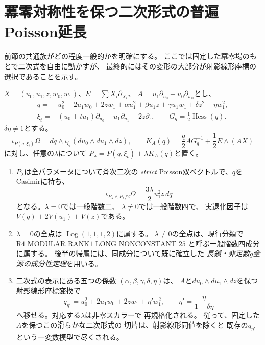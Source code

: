 
\section{冪零対称性を保つ二次形式の普遍Poisson延長}
\label{sec:universal-nilpotent-pencil}
前節の共通族がどの程度一般的かを明確にする。
ここでは固定した冪零場のもとで二次式を自由に動かすが、
最終的にはその変形の大部分が射影線形座標の選択であることを示す。

\begin{theorem}[冪零対称性に沿う普遍延長と二次式の規格化]
\label{thm:universal-nilpotent-pencil}
$X=(u_0,u_1,z,w_0,w_1)$、$E=\sum X_i\partial_{X_i}$、
$A=u_1\partial_{u_0}-u_0\partial_{w_0}$とし、
\[
\begin{split}
q={}&u_0^2+2u_1w_0+2zw_1+
\alpha u_1^2+\beta u_1z+\gamma u_1w_1
+\delta z^2+\eta w_1^2,\\
\xi_t={}&(u_0+tu_1)\partial_{u_0}
             +u_1\partial_{u_1}-2z\partial_z,
\qquad G_q=\tfrac12\operatorname{Hess}(q).
\end{split}
\]
$\delta\eta\ne1$とする。
\[
 \iota_{P(q,\xi_t)}\Omega
 =dq\wedge\iota_{\xi_t}(du_0\wedge du_1\wedge dz),\qquad
 K_A(q)=\frac q2AG_q^{-1}+\frac12E\wedge(AX)
\]
に対し、任意の$\lambda$について
$P_\lambda=P(q,\xi_t)+\lambda K_A(q)$と置く。
\begin{enumerate}
\item $P_\lambda$は全パラメータについて斉次二次の
\emph{strict} Poisson双ベクトルで、$q$をCasimirに持ち、
\begin{equation}\label{eq:universal-nilpotent-pfaffian}
 \iota_{P_\lambda\wedge P_\lambda/2}\Omega
   =\frac{3\lambda}{2}u_1^2z\,dq
\end{equation}
となる。$\lambda=0$では一般階数二、
$\lambda\ne0$では一般階数四で、
実退化因子は$V(q)+2V(u_1)+V(z)$である。
\item $\lambda=0$の全点は
$\overline{\operatorname{Log}(1,1,1,2)}$に属する。
$\lambda\ne0$の全点は、現行分類で
$\mathrm{R4\_MODULAR\_RANK1\_LONG\_NONCONSTANT\_25}$
と呼ぶ一般階数四成分に属する。
後半の帰属には、同成分について既に確立した
\emph{長鎖・非定数$g$全源の成分性定理}を用いる。
\item 二次式の表示にある五つの係数
$(\alpha,\beta,\gamma,\delta,\eta)$は、
$A$と$du_0\wedge du_1\wedge dz$を保つ射影線形座標変換で
\begin{equation}\label{eq:universal-nilpotent-qnormal}
 q_{\eta'}=u_0^2+2u_1w_0+2zw_1+\eta'w_1^2,
 \qquad \eta'=\frac{\eta}{1-\delta\eta}
\end{equation}
へ移せる。対応する$\lambda$は非零スカラーで
再規格化される。
従って、固定した$A$を保つこの滑らかな二次形式の
切片は、射影線形同値を除くと
既存の$q_{\eta'}$という一変数模型で尽くされる。
\end{enumerate}
\end{theorem}

